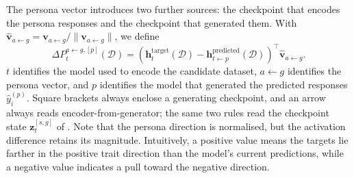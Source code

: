The persona vector introduces two further sources: the checkpoint that encodes the persona responses and the checkpoint that generated them. With $\widehat{\mathbf{v}}_{a\leftarrow g}=\mathbf{v}_{a\leftarrow g}/\lVert\mathbf{v}_{a\leftarrow g}\rVert$, we define
\begin{equation}
\Delta P_t^{a\leftarrow g,[p]}(\mathcal{D})
=
\left(
\mathbf{h}^{\text{target}}_{t}(\mathcal{D})
-
\mathbf{h}^{\text{predicted}}_{t\leftarrow p}(\mathcal{D})
\right)^{\!\top}
\widehat{\mathbf{v}}_{a\leftarrow g}.
\label{eq:deltap-provenance}
\end{equation}
$t$ identifies the model used to encode the candidate dataset, $a\leftarrow g$ identifies the persona vector, and $p$ identifies the model that generated the predicted responses $\widehat{y}^{(p)}_i$. Square brackets always enclose a generating checkpoint, and an arrow always reads encoder-from-generator; the same two rules read the checkpoint state $\mathbf{z}_t^{[s,g]}$ of . Note that the persona direction is normalised, but the activation difference retains its magnitude. Intuitively, a positive value means the targets lie farther in the positive trait direction than the model's current predictions, while a negative value indicates a pull toward the negative direction.

